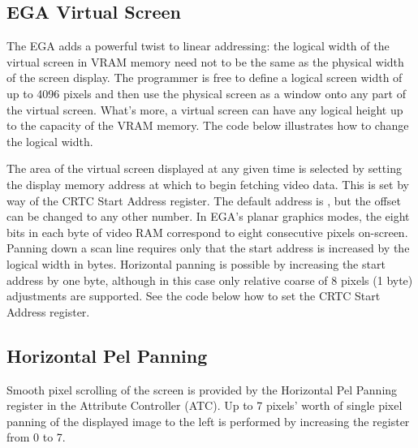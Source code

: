 \documentclass[book.tex]{subfiles}
\begin{document}
\subsection{EGA Virtual Screen}

The EGA adds a powerful twist to linear addressing: the logical width of the virtual screen in VRAM memory need not to be the same as the physical width of the screen display. The programmer is free to define a logical screen width of up to 4096 pixels and then use the physical screen as a window onto any part of the virtual screen. What's more, a virtual screen can have any logical height up to the capacity of the VRAM memory. The code below illustrates how to change the logical width.\\

\begin{minipage}{\textwidth}
  
  \end{minipage}
  \label{ega_pel_pan}
  \par

The area of the virtual screen displayed at any given time is selected by setting the display memory address at which to begin fetching video data. This is set by way of the CRTC Start Address register. The default address is , but the offset can be changed to any other number. In EGA's planar graphics modes, the eight bits in each byte of video RAM correspond to eight consecutive pixels on-screen. Panning down a scan line requires only that the start address is increased by the logical width in bytes. Horizontal panning is possible by increasing the start address by one byte, although in this case only relative coarse of 8 pixels (1 byte)  adjustments are supported. See the code below how to set the CRTC Start Address register.

\begin{minipage}{\textwidth}
  
  \end{minipage}
  \label{ega_set_address}
  \par

\subsection{Horizontal Pel Panning}
Smooth pixel scrolling of the screen is provided by the Horizontal Pel Panning register in the Attribute Controller (ATC). Up to 7 pixels' worth of single pixel panning of the displayed image to the left is performed by increasing the register from 0 to 7. \\
\par
\end{document}
